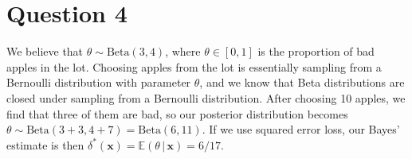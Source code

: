 \documentclass[10pt]{article}
\begin{document}
\section{Question 4} \noindent
We believe that \(\theta \sim \mathrm{Beta}(3, 4)\), where \(\theta \in [0,1]\) is the proportion of bad apples in the lot. 
Choosing apples from the lot is essentially sampling from a Bernoulli distribution with parameter \(\theta\),
and we know that Beta distributions are closed under sampling from a Bernoulli distribution. After choosing 
10 apples, we find that three of them are bad, so our posterior distribution becomes \(\theta \sim \mathrm{Beta}(3+3, 4+7) = \mathrm{Beta}(6,11)\).
If we use squared error loss, our Bayes' estimate is then \(\delta^*(\mathbf{x}) = \mathbb{E}(\theta \,|\, \mathbf{x}) = 6 / 17\).
\end{document}
